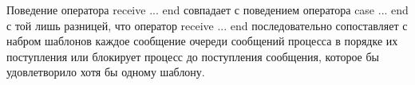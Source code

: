 Поведение оператора receive ... end совпадает с поведением оператора case ... end с той лишь разницей, что оператор receive ... end последовательно сопоставляет с набром шаблонов каждое сообщение очереди сообщений процесса в порядке их поступления или блокирует процесс до поступления сообщения, которое бы удовлетворило хотя бы одному шаблону.


